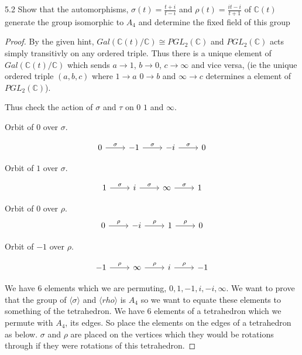 \documentclass{article}
\newcommand{\C}{\mathbb{C}}
\newcommand{\angles}[1]{\langle #1 \rangle}
\begin{document}
\begin{PROB}{5.2}\label{Problem 5.2.}
    Show that the automorphisms, $\sigma(t) = \frac{t + i}{t - i}$ and $\rho(t) = \frac{it - i}{t + 1}$ of $\C(t)$ generate the group isomorphic to $A_4$ and determine the fixed field of this group       
\end{PROB}
\begin{proof}
    By the given hint, $Gal(\C(t)/ \C) \cong PGL_2(\C)$ and $PGL_2(\C)$ acts simply transitivly on any ordered triple. Thus there is a unique element of $Gal(\C(t) / \C)$ which sends $a \to 1$, $b \to 0$, $c \to \infty$ and vice versa, (ie the unique ordered triple $(a, b, c)$ where $1 \to a$ $0 \to b$ and $\infty \to c$ determines a element of $PGL_2(\C)$). 
    
    Thus check the action of $\sigma$ and $\tau$ on $0$ $1$ and $\infty$. 
    
    Orbit of $0$ over $\sigma$.
    
    \[\begin{tikzcd}
        0 & {-1} & {-i} & 0
        \arrow["\sigma", from=1-1, to=1-2]
        \arrow["\sigma", from=1-2, to=1-3]
        \arrow["\sigma", from=1-3, to=1-4]
    \end{tikzcd}\]

    Orbit of $1$ over $\sigma$. 
    
    \[\begin{tikzcd}
        1 & i & \infty & 1
        \arrow["\sigma", from=1-1, to=1-2]
        \arrow["\sigma", from=1-2, to=1-3]
        \arrow["\sigma", from=1-3, to=1-4]
    \end{tikzcd}\]

    Orbit of $0$ over $\rho$.
    \[\begin{tikzcd}
        0 & {-i} & 1 & 0
        \arrow["\rho", from=1-1, to=1-2]
        \arrow["\rho", from=1-2, to=1-3]
        \arrow["\rho", from=1-3, to=1-4]
    \end{tikzcd}\]

    Orbit of $-1$ over $\rho$.   
    
    \[\begin{tikzcd}
        {-1} & \infty & i & {-1}
        \arrow["\rho", from=1-2, to=1-3]
        \arrow["\rho", from=1-3, to=1-4]
        \arrow["\rho", from=1-1, to=1-2]
    \end{tikzcd}\]

    We have 6 elements which we are permuting, $0, 1, - 1, i, -i, \infty$. We want to prove that the group of $\angles{\sigma}$ and $\angles{rho}$ is $A_4$ so we want to equate these elements to something of the tetrahedron. We have 6 elements of a tetrahedron which we permute with $A_4$, its edges. So place the elements on the edges of a tetrahedron as below. $\sigma$ and $\rho$ are placed on the vertices which they would be rotations through if they were rotations of this tetrahedron.         


\end{proof}
\end{document}

